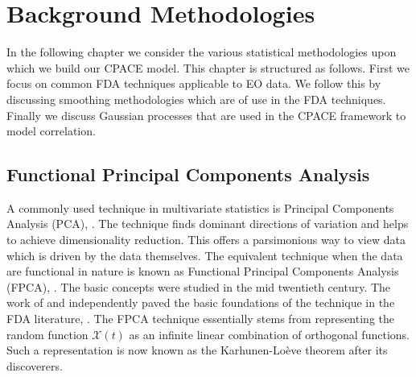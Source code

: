 
\chapter{Background Methodologies \label{cha:background}}  %


\ifpdf
    \graphicspath{{Chapter3/Figs/Raster/}{Chapter3/Figs/PDF/}{Chapter3/Figs/}}
\else
    \graphicspath{{Chapter3/Figs/Vector/}{Chapter3/Figs/}}
\fi

In the following chapter we consider the various statistical methodologies  upon which we build our CPACE model.
This chapter is structured as follows.
First we focus on common FDA techniques applicable to EO data.
We follow this by discussing smoothing methodologies which are of use in the FDA techniques. 
Finally we discuss Gaussian processes that are used in the CPACE framework to model correlation. 

\section{Functional Principal Components Analysis \label{sec:fpca}}
A commonly used technique in multivariate statistics is Principal Components Analysis (PCA), \citep{wold_principal_1987}. 
The technique finds dominant directions of variation and helps to achieve dimensionality reduction.
This offers a parsimonious way to view data which is driven by the data themselves.
The equivalent technique when the data are functional in nature is known as Functional Principal Components Analysis (FPCA), \citep{ramsay_functional_2010}.
The basic concepts were studied in the mid twentieth century.
The work of \citeauthor{karhunen_zur_1946} and independently \citeauthor{loeve_fonctions_1946} paved the basic foundations of the technique in the FDA literature, \citep{karhunen_zur_1946, loeve_fonctions_1946}.
The FPCA technique essentially stems from representing the random function $\mathcal{X}(t)$ as an infinite linear combination of orthogonal functions.
Such a representation is now known as the Karhunen-Lo\`{e}ve theorem after its discoverers.

